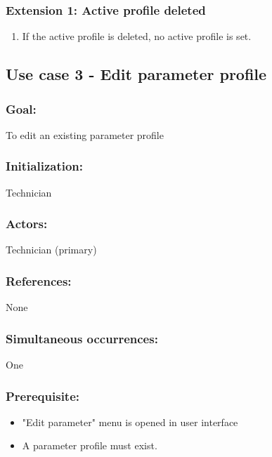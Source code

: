 \begin{framed}
	\subsubsection*{Extension 1: Active profile deleted}
	\begin{enumerate}
		\item If the active profile is deleted, no active profile is set.
	\end{enumerate}
	
	
\end{framed}

\begin{framed}
	\subsection{Use case 3 - Edit parameter profile}
	\subsubsection*{Goal:}
	To edit an existing parameter profile 
	
	\subsubsection*{Initialization:}
	Technician
	
	\subsubsection*{Actors:}
	Technician (primary)
	
	\subsubsection*{References:}
	None
	
	\subsubsection*{Simultaneous occurrences:}
	One
	
	\subsubsection*{Prerequisite:}
	\begin{itemize}
		\item "Edit parameter" menu is opened in user interface
		\item A parameter profile must exist.
	\end{itemize}
	

\end{framed}
